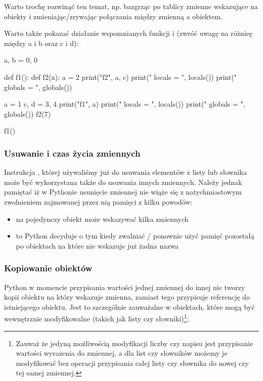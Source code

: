 \documentclass{pdfBooklets}
\begin{document}
\begin{teacherOnly}
Warto trochę rozwinąć ten temat, np. bazgrząc po tablicy zmienne wskazujące na obiekty i zmieniając/zrywając połączania między zmienną a obiektem.

Warto także pokazać działanie wspomnianych funkcji  i  (zwróć uwagę na różnicę między a i b oraz c i d):
\begin{CodeFrame*}[python]{}
a, b = 0, 0

def f1():
    def f2(x):
       a = 2
       print("f2", a, c)
       print(" locals  = ", locals())
       print(" globals = ", globals())
    
    a = 1
    c, d = 3, 4
    print("f1", a)
    print(" locals  = ", locals())
    print(" globals = ", globals())
    f2(7)

f1()
\end{CodeFrame*}
\end{teacherOnly}

\subsubsection{Usuwanie i czas życia zmiennych {\Symbola 🤔}}

Instrukcja , której używaliśmy już do usuwania elementów z listy lub słownika może być wykorzystana także do usuwania innych zmiennych.
Należy jednak pamiętać iż w Pythonie usunięcie zmiennej nie wiąże się z natychmiastowym zwolnieniem zajmowanej przez nią pamięci z kilku powodów:
\begin{itemize}
\item na pojedynczy obiekt może wskazywać kilka zmiennych
\item to Python decyduje o tym kiedy zwalniać / ponownie użyć pamięć pozostałą po obiektach na które nie wskazuje już żadna nazwa
\end{itemize}

\subsubsection{Kopiowanie obiektów {\Symbola 🤔}}

Python w momencie przypisania wartości jednej zmiennej do innej nie tworzy kopii obiektu na który wskazuje zmienna, zamiast tego przypisuje referencję do istniejącego obiektu.
Jest to szczególnie zauważalne w obiektach, które mogą być wewnętrznie modyfikowalne (takich jak listy czy słowniki)\footnote{
Zauważ że jedyną możliwością modyfikacji liczby czy napisu jest przypisanie wartości wyrażenia do zmiennej,
a dla list czy słowników możemy je modyfikować bez operacji przypisania całej listy czy słownika do nowej czy tej samej zmiennej.
}:
\end{document}
